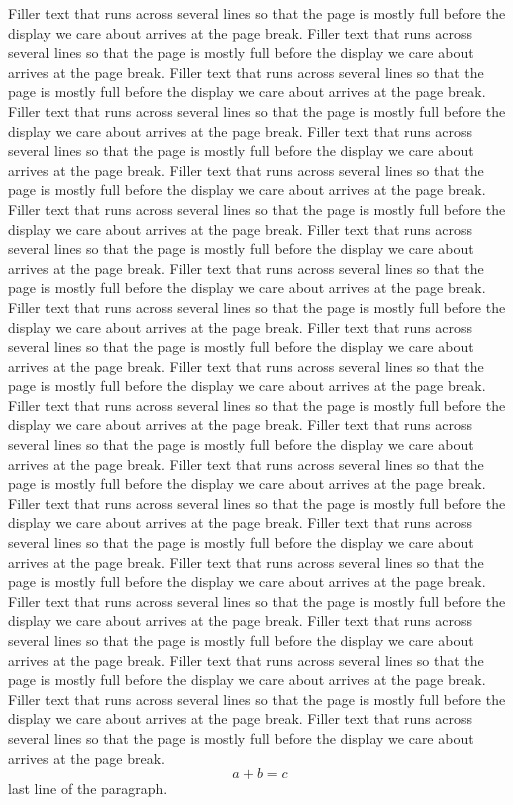 \documentclass[10pt]{article}
\begin{document}
Filler text that runs across several lines so that the page is mostly full before the display we care about arrives at the page break. Filler text that runs across several lines so that the page is mostly full before the display we care about arrives at the page break. Filler text that runs across several lines so that the page is mostly full before the display we care about arrives at the page break. Filler text that runs across several lines so that the page is mostly full before the display we care about arrives at the page break. Filler text that runs across several lines so that the page is mostly full before the display we care about arrives at the page break. Filler text that runs across several lines so that the page is mostly full before the display we care about arrives at the page break. Filler text that runs across several lines so that the page is mostly full before the display we care about arrives at the page break. Filler text that runs across several lines so that the page is mostly full before the display we care about arrives at the page break. Filler text that runs across several lines so that the page is mostly full before the display we care about arrives at the page break. Filler text that runs across several lines so that the page is mostly full before the display we care about arrives at the page break. Filler text that runs across several lines so that the page is mostly full before the display we care about arrives at the page break. Filler text that runs across several lines so that the page is mostly full before the display we care about arrives at the page break. Filler text that runs across several lines so that the page is mostly full before the display we care about arrives at the page break. Filler text that runs across several lines so that the page is mostly full before the display we care about arrives at the page break. Filler text that runs across several lines so that the page is mostly full before the display we care about arrives at the page break. Filler text that runs across several lines so that the page is mostly full before the display we care about arrives at the page break. Filler text that runs across several lines so that the page is mostly full before the display we care about arrives at the page break. Filler text that runs across several lines so that the page is mostly full before the display we care about arrives at the page break. Filler text that runs across several lines so that the page is mostly full before the display we care about arrives at the page break. Filler text that runs across several lines so that the page is mostly full before the display we care about arrives at the page break. Filler text that runs across several lines so that the page is mostly full before the display we care about arrives at the page break. Filler text that runs across several lines so that the page is mostly full before the display we care about arrives at the page break. Filler text that runs across several lines so that the page is mostly full before the display we care about arrives at the page break. 
\begin{equation} a + b = c \end{equation}
last line of the paragraph.
\end{document}
